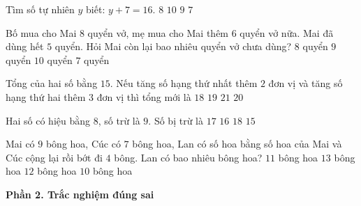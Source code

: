 \begin{ex} %
Tìm số tự nhiên $y$ biết: $y + 7 = 16$.
\choice
{$8$}
{$10$}
{\True $9$}
{$7$}
\end{ex}

\begin{ex} %
Bố mua cho Mai $8$ quyển vở, mẹ mua cho Mai thêm $6$ quyển vở nữa. Mai đã dùng hết $5$ quyển. Hỏi Mai còn lại bao nhiêu quyển vở chưa dùng?
\choice
{$8$ quyển}
{\True $9$ quyển}
{$10$ quyển}
{$7$ quyển}
\end{ex}

\begin{ex} %
Tổng của hai số bằng $15$. Nếu tăng số hạng thứ nhất thêm $2$ đơn vị và tăng số hạng thứ hai thêm $3$ đơn vị thì tổng mới là
\choice
{$18$}
{$19$}
{$21$}
{\True $20$}
\end{ex}

\begin{ex} %
Hai số có hiệu bằng $8$, số trừ là $9$. Số bị trừ là
\choice
{\True $17$}
{$16$}
{$18$}
{$15$}
\end{ex}

\begin{ex} %
Mai có $9$ bông hoa, Cúc có $7$ bông hoa, Lan có số hoa bằng số hoa của Mai và Cúc cộng lại rồi bớt đi $4$ bông. Lan có bao nhiêu bông hoa?
\choice
{$11$ bông hoa}
{$13$ bông hoa}
{\True $12$ bông hoa}
{$10$ bông hoa}
\end{ex}

\textbf{Phần 2. Trắc nghiệm đúng sai}

